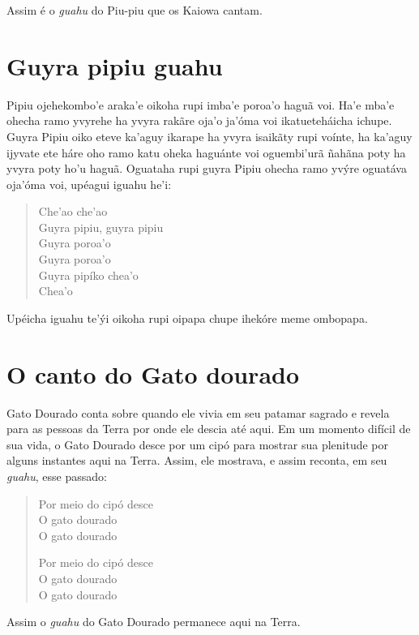 Assim é o \textit{guahu} do Piu-piu que os Kaiowa cantam.

\chapter{Guyra pipiu guahu}

 Pipiu ojehekombo'e araka'e oikoha rupi imba'e poroa'o haguã voi.
Ha'e mba'e ohecha ramo yvyrehe ha yvyra rakãre oja'o ja'óma voi
ikatueteháicha ichupe. Guyra Pipiu oiko eteve ka'aguy ikarape ha yvyra
isaikãty rupi voínte, ha ka'aguy ijyvate ete háre oho ramo katu oheka
haguánte voi oguembi'urã ñahãna poty ha yvyra poty ho'u haguã. Oguataha
rupi guyra Pipiu ohecha ramo yvýre oguatáva oja'óma voi, upéagui iguahu
he'i:


\begin{verse}
Che'ao che'ao\\
Guyra pipiu, guyra pipiu\\
Guyra poroa'o\\
Guyra poroa'o\\
Guyra pipíko chea'o\\
Chea'o
\end{verse}

Upéicha iguahu te'ýi oikoha rupi oipapa chupe ihekóre meme ombopapa.


\chapter{O canto do Gato dourado}

 Gato Dourado conta sobre quando ele vivia em seu patamar sagrado e
revela para as pessoas da Terra por onde ele descia até aqui. Em um
momento difícil de sua vida, o Gato Dourado desce por um cipó para
mostrar sua plenitude por alguns instantes aqui na Terra. Assim, ele
mostrava, e assim reconta, em seu \textit{guahu}, esse passado:

\begin{verse}
Por meio do cipó desce\\
O gato dourado\footnotemark{}\\
O gato dourado

Por meio do cipó desce\\
O gato dourado\\
O gato dourado
\end{verse}

Assim o \textit{guahu} do Gato Dourado permanece aqui na Terra.


